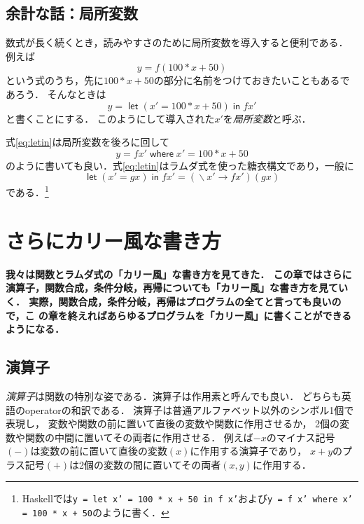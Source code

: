 \documentclass[twocolumn]{jsbook}
\newcommand{\programminglanguage}[1]{\textsf{#1}}
\newcommand{\haskell}{\programminglanguage{Haskell}}
\newcommand{\code}[1]{\texttt{#1}}
\newcommand{\keyword}[1]{{\emph{#1}}}
\newenvironment{leader}{\begingroup\bf}{\endgroup}
\newcommand{\mathKeyword}[1]{\mathsf{#1}}
\DeclareMathOperator{\mathLambda}{\backslash}
\DeclareMathOperator{\mathLetLet}{\mathKeyword{let}}
\DeclareMathOperator{\mathLetIn}{\mathKeyword{in}}
\DeclareMathOperator{\mathWhere}{\mathKeyword{where}}
\newcommand{\mathLambdaArrow}{\rightarrow}
\newcommand{\mathLambdaExpression}[2]{\mathLambda#1\mathLambdaArrow#2}
\newcommand{\mathLet}[2]{\mathLetLet#1\mathLetIn#2}
\begin{document}
\section{余計な話：局所変数}

数式が長く続くとき，読みやすさのために局所変数を導入すると便利である．
例えば
\begin{equation}
y=f\left(100*x+50\right)
\end{equation}
という式のうち，先に$100*x+50$の部分に名前をつけておきたいこともあるであろう．
そんなときは
\begin{equation}
\label{eq:letin}
y=\mathLet{\left(x'=100*x+50\right)}{fx'}
\end{equation}
と書くことにする．
このようにして導入された$x'$を\keyword{局所変数}と呼ぶ．

式\eqref{eq:letin}は局所変数を後ろに回して
\begin{equation}
y=fx'\mathWhere x'=100*x+50
\end{equation}
のように書いても良い．式\eqref{eq:letin}はラムダ式を使った糖衣構文であり，一般に
\begin{equation}
\mathLet{\left(x'=gx\right)}{fx'}=(\mathLambdaExpression{x'}{fx'})(gx)
\end{equation}
である．\footnote{\haskell では\code{y = let x' = 100 * x + 50 in f x'}および\code{y = f x' where x' = 100 * x + 50}のように書く．}


\chapter{さらにカリー風な書き方}

\begin{leader}
我々は関数とラムダ式の「カリー風」な書き方を見てきた．
この章ではさらに演算子，関数合成，条件分岐，再帰についても「カリー風」な書き方を見ていく．
実際，関数合成，条件分岐，再帰はプログラムの全てと言っても良いので，こ
の章を終えればあらゆるプログラムを「カリー風」に書くことができるようになる．
\end{leader}

\section{演算子}

\keyword{演算子}は関数の特別な姿である．演算子は作用素と呼んでも良い．
どちらも英語のoperatorの和訳である．
演算子は普通アルファベット以外のシンボル1個で表現し，
変数や関数の前に置いて直後の変数や関数に作用させるか，
2個の変数や関数の中間に置いてその両者に作用させる．
例えば$-x$のマイナス記号$(-)$は変数の前に置いて直後の変数$(x)$に作用する演算子であり，
$x+y$のプラス記号$(+)$は2個の変数の間に置いてその両者$\left(x,y\right)$に作用する．
\end{document}
